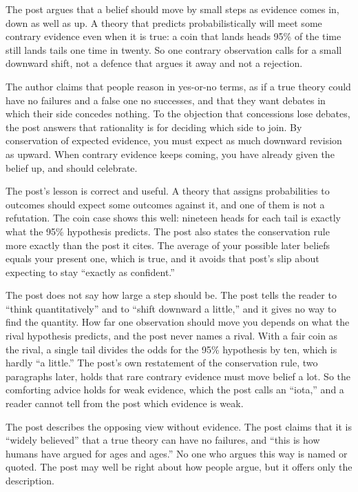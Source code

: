 \begin{afterword}
\summaryhead

The post argues that a belief should move by small steps as evidence comes in, down as well as up. A theory that predicts probabilistically will meet some contrary evidence even when it is true: a coin that lands heads 95\% of the time still lands tails one time in twenty. So one contrary observation calls for a small downward shift, not a defence that argues it away and not a rejection.

The author claims that people reason in yes-or-no terms, as if a true theory could have no failures and a false one no successes, and that they want debates in which their side concedes nothing. To the objection that concessions lose debates, the post answers that rationality is for deciding which side to join. By conservation of expected evidence, you must expect as much downward revision as upward. When contrary evidence keeps coming, you have already given the belief up, and should celebrate.

\responsehead

The post's lesson is correct and useful. A theory that assigns probabilities to outcomes should expect some outcomes against it, and one of them is not a refutation. The coin case shows this well: nineteen heads for each tail is exactly what the 95\% hypothesis predicts. The post also states the conservation rule more exactly than the post it cites. The average of your possible later beliefs equals your present one, which is true, and it avoids that post's slip about expecting to stay ``exactly as confident.''

The post does not say how large a step should be. The post tells the reader to ``think quantitatively'' and to ``shift downward a little,'' and it gives no way to find the quantity. How far one observation should move you depends on what the rival hypothesis predicts, and the post never names a rival. With a fair coin as the rival, a single tail divides the odds for the 95\% hypothesis by ten, which is hardly ``a little.'' The post's own restatement of the conservation rule, two paragraphs later, holds that rare contrary evidence must move belief a lot. So the comforting advice holds for weak evidence, which the post calls an ``iota,'' and a reader cannot tell from the post which evidence is weak.

The post describes the opposing view without evidence. The post claims that it is ``widely believed'' that a true theory can have no failures, and ``this is how humans have argued for ages and ages.'' No one who argues this way is named or quoted. The post may well be right about how people argue, but it offers only the description.


\end{afterword}
